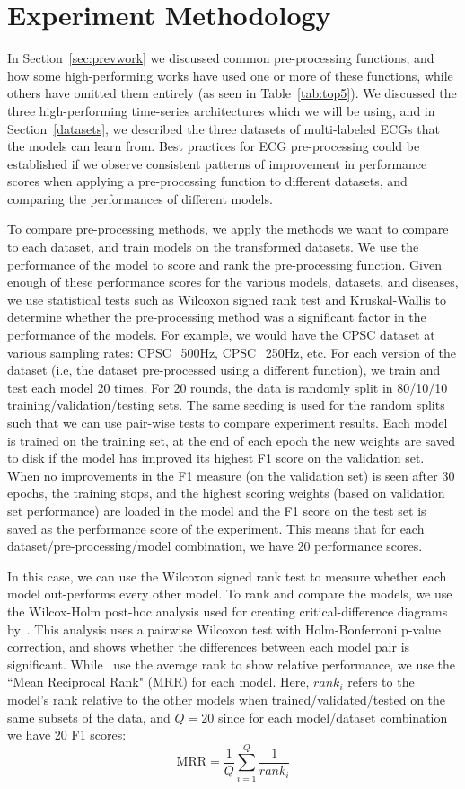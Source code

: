 \documentclass[pmlr,twocolumn]{jmlr}%
\begin{document}
\section{Experiment Methodology}
\label{sec:experiment}

In Section~\ref{sec:prevwork} we discussed common pre-processing functions, and how some high-performing works have used one or more of these functions, while others have omitted them entirely (as seen in Table~\ref{tab:top5}). We discussed the three high-performing time-series architectures which we will be using, and in Section~\ref{datasets}, we described the three datasets of multi-labeled ECGs that the models can learn from. Best practices for ECG pre-processing could be established if we observe consistent patterns of improvement in performance scores when applying a pre-processing function to different datasets, and comparing the performances of different models.

To compare pre-processing methods, we apply the methods we want to compare to each dataset, and train models on the transformed datasets. We use the performance of the model to score and rank the pre-processing function. Given enough of these performance scores for the various models, datasets, and diseases, we use statistical tests such as Wilcoxon signed rank test and Kruskal-Wallis to determine whether the pre-processing method was a significant factor in the performance of the models. For example, we would have the CPSC dataset at various sampling rates: CPSC\_500Hz, CPSC\_250Hz, etc. For each version of the dataset (i.e, the dataset pre-processed using a different function), we train and test each model 20 times. For 20 rounds, the data is randomly split in 80/10/10 training/validation/testing sets. The same seeding is used for the random splits such that we can use pair-wise tests to compare experiment results. Each model is trained on the training set, at the end of each epoch the new weights are saved to disk if the model has improved its highest F1 score on the validation set. When no improvements in the F1 measure (on the validation set) is seen after 30 epochs, the training stops, and the highest scoring weights (based on validation set performance) are loaded in the model and the F1 score on the test set is saved as the performance score of the experiment. This means that for each dataset/pre-processing/model combination, we have 20 performance scores. 

In this case, we can use the Wilcoxon signed rank test to measure whether each model out-performs every other model. To rank and compare the models, we use the Wilcox-Holm post-hoc analysis used for creating critical-difference diagrams by~\citet{IsmailFawaz2018deep}. This analysis uses a pairwise Wilcoxon test with Holm-Bonferroni p-value correction, and shows whether the differences between each model pair is significant. While~\citet{IsmailFawaz2018deep} use the average rank to show relative performance, we use the ``Mean Reciprocal Rank" (MRR) for each model. Here, $rank_i$ refers to the model's rank relative to the other models when trained/validated/tested on the same subsets of the data, and $Q=20$ since for each model/dataset combination we have 20 F1 scores:
\[ \text{MRR} = \frac{1}{Q}\sum_{i=1}^{Q}\frac{1}{rank_i} \]
\end{document}
